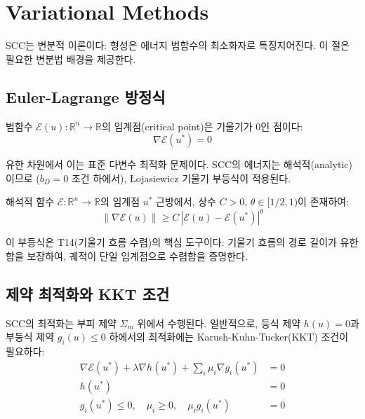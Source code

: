 \section{Variational Methods}
\label{app:variational}

SCC는 변분적 이론이다: 형성은 에너지 범함수의 최소화자로 특징지어진다. 이 절은 필요한 변분법 배경을 제공한다.


\subsection{Euler-Lagrange 방정식}

범함수 $\mathcal{E}(u) : \mathbb{R}^n \to \mathbb{R}$의 임계점(critical point)은 기울기가 0인 점이다:
\begin{equation}
    \nabla \mathcal{E}(u^*) = 0
    \label{eq:euler-lagrange}
\end{equation}

유한 차원에서 이는 표준 다변수 최적화 문제이다. SCC의 에너지는 해석적(analytic)이므로 ($b_D = 0$ 조건 하에서), Łojasiewicz 기울기 부등식이 적용된다.

\begin{theorem}
해석적 함수 $\mathcal{E} : \mathbb{R}^n \to \mathbb{R}$의 임계점 $u^*$ 근방에서, 상수 $C > 0$, $\theta \in [1/2, 1)$이 존재하여:
\begin{equation}
    \|\nabla \mathcal{E}(u)\| \geq C\, |\mathcal{E}(u) - \mathcal{E}(u^*)|^\theta
    \label{eq:lojasiewicz}
\end{equation}
\end{theorem}

이 부등식은 T14(기울기 흐름 수렴)의 핵심 도구이다: 기울기 흐름의 경로 길이가 유한함을 보장하여, 궤적이 단일 임계점으로 수렴함을 증명한다.


\subsection{제약 최적화와 KKT 조건}

SCC의 최적화는 부피 제약 $\Sigma_m$ 위에서 수행된다. 일반적으로, 등식 제약 $h(u) = 0$과 부등식 제약 $g_i(u) \leq 0$ 하에서의 최적화에는 Karush-Kuhn-Tucker(KKT) 조건이 필요하다:
\begin{align}
    \nabla \mathcal{E}(u^*) + \lambda \nabla h(u^*) + \sum_i \mu_i \nabla g_i(u^*) &= 0 \label{eq:kkt-stationarity}\\
    h(u^*) &= 0 \label{eq:kkt-equality}\\
    g_i(u^*) \leq 0, \quad \mu_i \geq 0, \quad \mu_i g_i(u^*) &= 0 \label{eq:kkt-complementarity}
\end{align}

